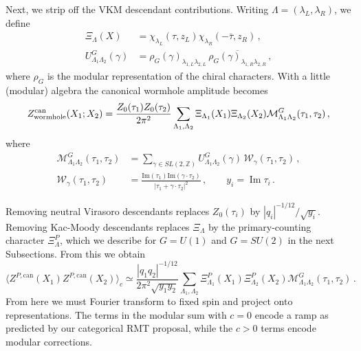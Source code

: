 \documentclass[11pt]{article}
\numberwithin{equation}{section}
\begin{document}
Next, we strip off the VKM descendant contributions. Writing $\Lambda = (\lambda_L,\lambda_R)$, we define
\begin{equation}
\begin{aligned}
 \Xi_\Lambda(X)&=\chi_{\lambda_L}(\tau,z_L)
                  \chi_{\lambda_R}(-\bar\tau,z_R)\,,\\
 U^G_{\Lambda_1\Lambda_2}(\gamma)
 &=\rho_G(\gamma)_{\lambda_{1,L}\lambda_{2,L}}\,
   \overline{\rho_G(\gamma)_{\lambda_{1,R}\lambda_{2,R}}}\,,
\end{aligned}
\label{eq:paired-modular-matrix}
\end{equation}
where $\rho_G$ is the modular representation of the chiral characters. With a little (modular) algebra the canonical wormhole amplitude becomes
\begin{equation}
Z_{\rm wormhole}^{\mathrm{can}}(X_1;X_2)
 =\frac{Z_0(\tau_1)Z_0(\tau_2)}{2\pi^2}
 \sum_{\Lambda_1,\Lambda_2}
 \Xi_{\Lambda_1}(X_1)\Xi_{\Lambda_2}(X_2)
 \mathcal M^G_{\Lambda_1\Lambda_2}(\tau_1,\tau_2)\,,
\label{eq:full-character-expansion}
\end{equation}
where
\begin{equation}
\begin{aligned}
 \mathcal M^G_{\Lambda_1\Lambda_2}(\tau_1,\tau_2)
 &=\sum_{\gamma\in SL(2,\mathbb Z)}
 U^G_{\Lambda_1\Lambda_2}(\gamma)\,
 \mathcal W_\gamma(\tau_1,\tau_2)\,,\\
 \mathcal W_\gamma(\tau_1,\tau_2)
 &=\frac{\text{Im}(\tau_1)\text{Im}(\gamma\cdot \tau_2)}{|\tau_1+\gamma\cdot \tau_2|^2}\,,
 \qquad y_i=\operatorname{Im}\tau_i\,.
\end{aligned}
\label{eq:full-modular-coefficient}
\end{equation}

Removing neutral Virasoro descendants replaces $Z_0(\tau_i)$ by $|q_i|^{-1/12}/\sqrt{y_i}$. Removing Kac-Moody descendants replaces $\Xi_\Lambda$ by the primary-counting character $\Xi_\Lambda^P$, which we describe for $G=U(1)$ and $G=SU(2)$ in the next Subsections. From this we obtain 
\begin{equation}
 \big\langle Z^{P,\mathrm{can}}(X_1)Z^{P,\mathrm{can}}(X_2)\big\rangle_c
 \simeq \frac{|q_1q_2|^{-1/12}}{2\pi^2\sqrt{y_1y_2}}
 \sum_{\Lambda_1,\Lambda_2}
 \Xi_{\Lambda_1}^{P}(X_1)\Xi_{\Lambda_2}^{P}(X_2)
 \mathcal M^G_{\Lambda_1\Lambda_2}(\tau_1,\tau_2)\,.
\label{eq:full-spectral-projection}
\end{equation}
From here we must Fourier transform to fixed spin and project onto representations. The terms in the modular sum with $c=0$ encode a ramp as predicted by our categorical RMT proposal, while the $c>0$ terms encode modular corrections.
\end{document}
